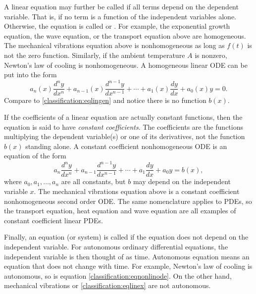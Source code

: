 \medskip

A linear equation may further be called \emph{} if
all terms depend on the dependent variable.  That is, if no
term is a function of the independent variables alone.  Otherwise, the
equation is called \emph{} or
\emph{}.  For example,
the exponential growth equation, the wave equation, or the transport equation above
are homogeneous. The mechanical vibrations equation above is nonhomogeneous
as long as $f(t)$ is not the zero function.  Similarly, if the ambient temperature $A$ is nonzero,
Newton's law of cooling is nonhomogeneous.
A homogeneous linear ODE can be put into the form
\begin{equation*}
a_n(x) \frac{d^n y}{dx^n} + 
a_{n-1}(x) \frac{d^{n-1} y}{dx^{n-1}} + 
\cdots
+
a_{1}(x) \frac{dy}{dx}
+
a_{0}(x) y = 0 .
\end{equation*}
Compare to \eqref{classification:eqlingen} and notice there is no
function $b(x)$.

\medskip

If the coefficients of a linear equation are actually constant functions,
then the equation is said to have
\emph{constant coefficients}.
The coefficients are the functions multiplying the dependent
variable(s) or one of its derivatives, not the function $b(x)$ standing alone.
A constant coefficient nonhomogeneous ODE is an equation of the form
\begin{equation*}
a_n \frac{d^n y}{dx^n} + 
a_{n-1} \frac{d^{n-1} y}{dx^{n-1}} + 
\cdots
+
a_{1} \frac{dy}{dx}
+
a_{0} y = b(x) ,
\end{equation*}
where $a_0, a_1, \ldots, a_n$ are all constants,
but $b$ may depend on 
the independent variable $x$.
The mechanical vibrations equation
above is a constant coefficient nonhomogeneous second order ODE\@.
The same nomenclature applies to PDEs, so the transport equation,
heat equation and wave equation are all examples of constant coefficient
linear PDEs.

\medskip

Finally, an equation (or system) is called \emph{}
if the equation does not depend on the independent variable.
For autonomous ordinary differential equations, the
independent variable is then thought of as time.  Autonomous equation
means an equation that does not change with time.
For example, Newton's law of cooling is autonomous, so is equation
\eqref{classification:eqnonlinode}.  On the other hand, mechanical
vibrations or 
\eqref{classification:eqlinex} are not autonomous.

